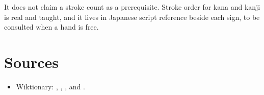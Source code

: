 It does not claim a stroke count as a prerequisite. Stroke order for kana and kanji is real and taught, and it lives in Japanese script reference beside each sign, to be consulted when a hand is free.

\section*{Sources}

\begin{itemize}
\raggedright
\setlength{\itemsep}{0.35em}
  \item Wiktionary: \href{https://en.wiktionary.org/wiki/\%E3\%81\%AF\%E3\%81\%84}{}, \href{https://en.wiktionary.org/wiki/\%E4\%BB\%8A\%E6\%97\%A5\%E3\%81\%AF}{}, \href{https://en.wiktionary.org/wiki/\%E6\%9C\%89\%E9\%9B\%A3\%E3\%81\%86}{}, and \href{https://en.wiktionary.org/wiki/\%E3\%82\%B3\%E3\%83\%BC\%E3\%83\%92\%E3\%83\%BC}{}.
\end{itemize}

